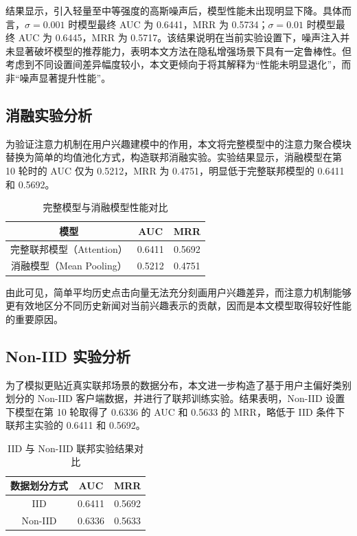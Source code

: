 \documentclass[UTF8,a4paper,12pt]{ctexart}
\numberwithin{equation}{section}
\begin{document}
结果显示，引入轻量至中等强度的高斯噪声后，模型性能未出现明显下降。具体而言，$\sigma=0.001$ 时模型最终 AUC 为 0.6441，MRR 为 0.5734；$\sigma=0.01$ 时模型最终 AUC 为 0.6445，MRR 为 0.5717。该结果说明在当前实验设置下，噪声注入并未显著破坏模型的推荐能力，表明本文方法在隐私增强场景下具有一定鲁棒性。但考虑到不同设置间差异幅度较小，本文更倾向于将其解释为“性能未明显退化”，而非“噪声显著提升性能”。

\subsection{消融实验分析}
为验证注意力机制在用户兴趣建模中的作用，本文将完整模型中的注意力聚合模块替换为简单的均值池化方式，构造联邦消融实验。实验结果显示，消融模型在第 10 轮时的 AUC 仅为 0.5212，MRR 为 0.4751，明显低于完整联邦模型的 0.6411 和 0.5692。

\begin{table}[H]
\centering
\caption{完整模型与消融模型性能对比}
\small
\begin{tabular}{ccc}
\toprule
模型 & AUC & MRR \\
\midrule
完整联邦模型（Attention） & 0.6411 & 0.5692 \\
消融模型（Mean Pooling） & 0.5212 & 0.4751 \\
\bottomrule
\end{tabular}
\end{table}

由此可见，简单平均历史点击向量无法充分刻画用户兴趣差异，而注意力机制能够更有效地区分不同历史新闻对当前兴趣表示的贡献，因而是本文模型取得较好性能的重要原因。

\subsection{Non-IID 实验分析}
为了模拟更贴近真实联邦场景的数据分布，本文进一步构造了基于用户主偏好类别划分的 Non-IID 客户端数据，并进行了联邦训练实验。结果表明，Non-IID 设置下模型在第 10 轮取得了 0.6336 的 AUC 和 0.5633 的 MRR，略低于 IID 条件下联邦主实验的 0.6411 和 0.5692。

\begin{table}[H]
\centering
\caption{IID 与 Non-IID 联邦实验结果对比}
\small
\begin{tabular}{ccc}
\toprule
数据划分方式 & AUC & MRR \\
\midrule
IID & 0.6411 & 0.5692 \\
Non-IID & 0.6336 & 0.5633 \\
\bottomrule
\end{tabular}
\end{table}
\end{document}
